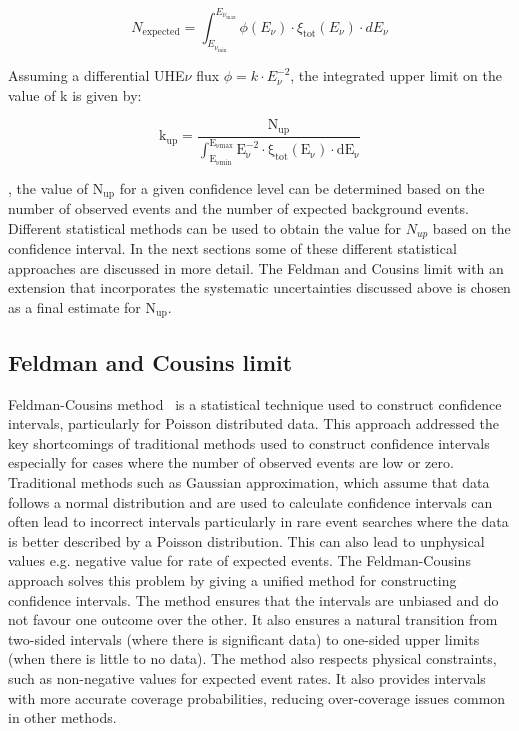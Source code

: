 \begin{equation}
  N_{\text{expected}} = \int_{E_{\nu_{\text{min}}}}^{E_{\nu_{\text{max}}}} \phi(E_{\nu}) \cdot \xi_{\text{tot}}(E_{\nu}) \cdot dE_{\nu}
\end{equation}

Assuming a differential UHE$\nu$ flux $\phi = k \cdot E_{\nu}^{-2}$, the integrated upper limit on the value of k is given by:

\begin{equation}
  \label{eq:integ_lim}
  \mathrm{k_{up} = \frac{N_{up}}{\int_{E_{\nu min}}^{E_{\nu max}} E_{\nu}^{-2} \cdot \xi_{tot}(E_{\nu}) \cdot dE_{\nu}}}
\end{equation}

, the value of $\mathrm{N_{up}}$ for a given confidence level can be determined based on the number of observed events and the number of expected background events. Different statistical methods can be used to obtain the value for $N_{up}$ based on the confidence interval. In the next sections some of these different statistical approaches are discussed in more detail. The Feldman and Cousins limit with an extension that incorporates the systematic uncertainties discussed above is chosen as a final estimate for $\mathrm{N_{up}}$.

\subsection{Feldman and Cousins limit}
\label{subsec:FandC}
Feldman-Cousins method~\cite{Feldman:1997qc} is a statistical technique used to construct confidence intervals, particularly for Poisson distributed data. This approach addressed the key shortcomings of traditional methods used to construct confidence intervals especially for cases where the number of observed events are low or zero. Traditional methods such as Gaussian approximation, which assume that data follows a normal distribution and are used to calculate confidence intervals can often lead to incorrect intervals particularly in rare event searches where the data is better described by a Poisson distribution. This can also lead to unphysical values e.g. negative value for rate of expected events. The Feldman-Cousins approach solves this problem by giving a unified method for constructing confidence intervals. The method ensures that the intervals are unbiased and do not favour one outcome over the other. It also ensures a natural transition from two-sided intervals (where there is significant data) to one-sided upper limits (when there is little to no data). The method also respects physical constraints, such as non-negative values for expected event rates. It also provides intervals with more accurate coverage probabilities, reducing over-coverage issues common in other methods. 


